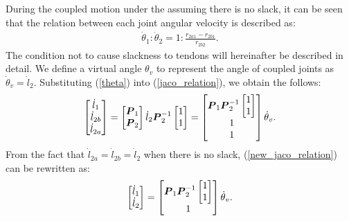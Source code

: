 \documentclass{llncs}
\def\vect#1{\mbox{\boldmath$#1$}}
\begin{document}
During the coupled motion under the assuming there is no slack, it can be seen that the relation between each joint angular velocity is described as:
\begin{align}
	\dot{\theta}_{1}:\dot{\theta}_{2}=1:\frac{r_{2a1}-r_{2b1}}{r_{2b2}}.
\end{align}
The condition not to cause slackness to tendons will hereinafter be described in detail.
We define a virtual angle $\theta_v$ to represent the angle of coupled joints as $\dot{\theta}_v=\dot{l}_2$.
Substituting (\ref{theta}) into (\ref{jaco_relation}), we obtain the follows:
\begin{align}
	\begin{bmatrix}
		\dot{l}_{1}\\
		\dot{l}_{2b}\\
		\dot{l}_{2a}
	\end{bmatrix}
	=
	\begin{bmatrix}
	\vect{P}_{1}\\
	\vect{P}_{2}
	\end{bmatrix}
	\dot{l}_{2}\vect{P}_{2}^{-1}
								\begin{bmatrix}
									1\\
									1
								\end{bmatrix}
								=
								\begin{bmatrix}\vect{P}_{1}\vect{P}_{2}^{-1}
																				\begin{bmatrix}
																			1\\
																			1
																				\end{bmatrix}
																			\\
								1\\
								1
								\end{bmatrix}
										\dot{\theta}_v.			\label{new_jaco_relation}
\end{align}
From the fact that $\dot{l}_{2a}=\dot{l}_{2b}=\dot{l}_{2}$ when there is no slack, (\ref{new_jaco_relation}) can be rewritten as:
\begin{align}
	\begin{bmatrix}
		\dot{l}_{1}\\
		\dot{l}_{2}
	\end{bmatrix}
	=
	\begin{bmatrix}\vect{P}_{1}\vect{P}_{2}^{-1}
													\begin{bmatrix}
												1\\
												1
													\end{bmatrix}
												\\
	1
	\end{bmatrix}
			\dot{\theta}_v.
\end{align}
\end{document}
